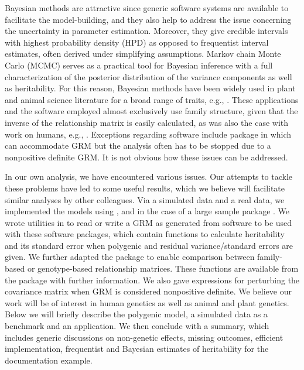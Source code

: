 \documentclass[article]{jss}
\begin{document}
Bayesian methods are attractive since generic software systems are
available to facilitate the model-building, and they also help to
address the issue concerning the uncertainty in parameter
estimation. Moreover, they give credible intervals with highest
probability density (HPD) as opposed to frequentist interval
estimates, often derived under simplifying assumptions. Markov chain
Monte Carlo (MCMC) serves as a practical tool for Bayesian inference
with a full characterization of the posterior distribution of the
variance components as well as heritability. For this reason, Bayesian
methods have been widely used in plant and animal science literature
for a broad range of traits, e.g., \cite{yi00, varona05}. These
applications and the software employed almost exclusively use family
structure, given that the inverse of the relationship matrix is easily
calculated, as was also the case with work on humans, e.g.,
\cite{burton05}. Exceptions regarding software include package
 \citep{perez10, deloscampos13} in  \citep{R}
which can accommodate GRM but the analysis often has to be stopped due
to a nonpositive definite GRM. It is not obvious how these issues can
be addressed.

In our own analysis, we have encountered various issues.  Our attempts
to tackle these problems have led to some useful results, which we
believe will facilitate similar analyses by other colleagues.  Via a
simulated data and a real data, we implemented the models using
 \citep[just another Gibbs sampler;][]{JAGS},
 \citep[sampling through adaptive
neighborhoods;][]{stan, StanJSS} and in the case of a large sample
package . We wrote utilities in  to read or write
a GRM as generated from software  \citep{yang11} to be used
with these software packages, which contain functions to calculate
heritability and its standard error when polygenic and residual
variance/standard errors are given. We further adapted the
 package  \citep{hadfield10} to enable
comparison between family-based or genotype-based relationship
matrices. These functions are available from the  package
 \citep{gap,zhao07} with further information. We also gave
expressions for perturbing the covariance matrix when GRM is considered
nonpositive definite. We believe our work will be of interest in human
genetics as well as animal and plant genetics. Below we will briefly
describe the polygenic model, a simulated data as a benchmark and
an application. We then
conclude with a summary, which includes generic discussions on
non-genetic effects, missing outcomes, efficient implementation,
frequentist and Bayesian estimates of heritability for the 
documentation example.
\end{document}
